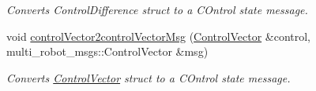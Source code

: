 \begin{DoxyCompactItemize}
\begin{DoxyCompactList}\small\item\em Converts Control\+Difference struct to a C\+Ontrol state message. \end{DoxyCompactList}\item 
void \hyperlink{classController_a06c1aab700c5918b76e33c35f3da8ea8}{control\+Vector2control\+Vector\+Msg} (\hyperlink{structController_1_1ControlVector}{Control\+Vector} \&control, multi\+\_\+robot\+\_\+msgs\+::\+Control\+Vector \&msg)
\begin{DoxyCompactList}\small\item\em Converts \hyperlink{structController_1_1ControlVector}{Control\+Vector} struct to a C\+Ontrol state message. \end{DoxyCompactList}\end{DoxyCompactItemize}
